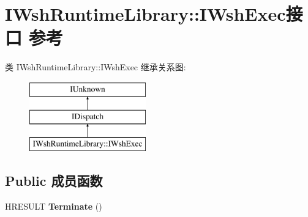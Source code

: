 \hypertarget{interface_i_wsh_runtime_library_1_1_i_wsh_exec}{}\section{I\+Wsh\+Runtime\+Library\+:\+:I\+Wsh\+Exec接口 参考}
\label{interface_i_wsh_runtime_library_1_1_i_wsh_exec}
类 I\+Wsh\+Runtime\+Library\+:\+:I\+Wsh\+Exec 继承关系图\+:\begin{figure}[H]
\begin{center}
\leavevmode
\includegraphics[height=3.000000cm]{interface_i_wsh_runtime_library_1_1_i_wsh_exec}
\end{center}
\end{figure}
\subsection*{Public 成员函数}
\begin{DoxyCompactItemize}
\item 
\mbox{\label{interface_i_wsh_runtime_library_1_1_i_wsh_exec_ad54b1d599311c83dddbb48ce1bc63e1f}} 
H\+R\+E\+S\+U\+LT {\bfseries Terminate} ()
\end{DoxyCompactItemize}
